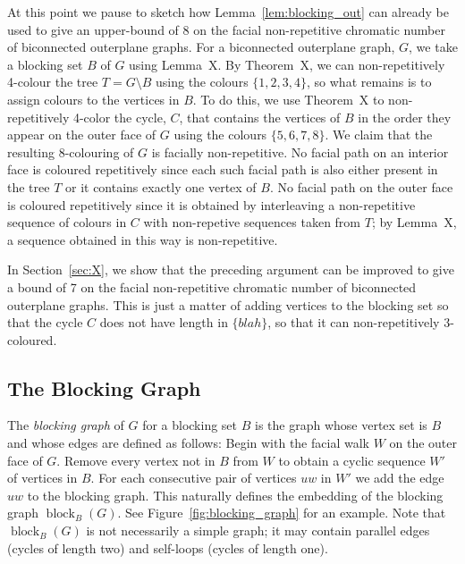 \documentclass{patmorin}
\DeclareMathOperator{\block}{block}
\begin{document}
At this point we pause to sketch how Lemma~\ref{lem:blocking_out}
can already be used to give an upper-bound of 8 on the facial
non-repetitive chromatic number of biconnected outerplane graphs.
For a biconnected outerplane graph, $G$, we take a blocking set $B$
of $G$ using Lemma~X.  By Theorem~X, we can non-repetitively 4-colour the tree
$T=G\setminus B$ using the colours $\{1,2,3,4\}$, so what remains is to assign
colours to the vertices in $B$.  To do this, we use Theorem~X to non-repetitively 4-color
the cycle, $C$, that contains the vertices of $B$ in the order they appear on
the outer face of $G$ using the colours $\{5,6,7,8\}$.  We claim that
the resulting 8-colouring of $G$ is facially non-repetitive.  No facial
path on an interior face is coloured repetitively since each such facial path
is also either present in the tree $T$ or it contains exactly one
vertex of $B$.  No facial path on the outer face is coloured repetitively
since it is obtained by interleaving a non-repetitive sequence of colours in $C$ with non-repetive sequences taken from $T$; by Lemma~X, a sequence obtained in this way is non-repetitive.

In Section~\ref{sec:X}, we show that the preceding argument can be
improved to give a bound of 7 on the facial non-repetitive chromatic
number of biconnected outerplane graphs. This is just a matter of adding
vertices to the blocking set so that the cycle $C$ does not have length
in $\{blah\}$, so that it can non-repetitively 3-coloured. 

\subsection{The Blocking Graph}


The \emph{blocking graph} of $G$ for a blocking set $B$ is the graph
whose vertex set is $B$ and whose edges are defined as follows:  Begin
with the facial walk $W$ on the outer face of $G$. Remove every vertex
 not in $B$ from $W$ to obtain a cyclic sequence $W'$ of vertices in
$B$. For each consecutive pair of vertices $uw$ in $W'$ we add the edge
 $uw$ to the blocking graph.  This naturally defines the embedding of
 the blocking graph $\block_B(G)$. See Figure~\ref{fig:blocking_graph}
 for an example.   Note that $\block_B(G)$ is not necessarily a simple
graph; it may contain parallel edges (cycles of length two) and self-loops
(cycles of length one). 
\end{document}

